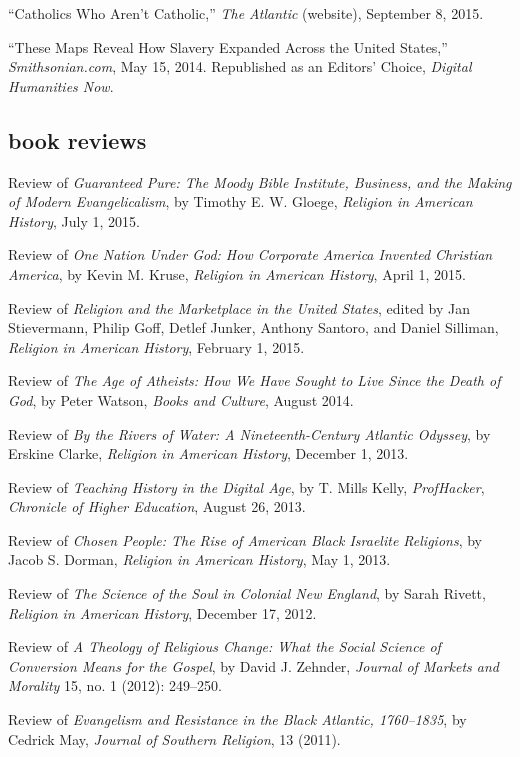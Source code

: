 \documentclass[11pt]{article}
\begin{document}
``Catholics Who Aren't Catholic,'' \emph{The Atlantic} (website), September 8, 
2015.

``These Maps Reveal How Slavery Expanded Across the United States,''
\emph{Smithsonian.com}, May 15, 2014. Republished as an Editors' Choice,
\emph{Digital Humanities Now}.

\subsection{book reviews}\label{book-reviews}

Review of \emph{Guaranteed Pure: The Moody Bible Institute, Business, and the 
  Making of Modern Evangelicalism}, by Timothy E. W. Gloege, \emph{Religion in 
  American History}, July 1, 2015.

Review of \emph{One Nation Under God: How Corporate America Invented Christian 
  America}, by Kevin M. Kruse, \emph{Religion in American History}, April 1, 
2015.

Review of \emph{Religion and the Marketplace in the United States},
edited by Jan Stievermann, Philip Goff, Detlef Junker, Anthony Santoro,
and Daniel Silliman, \emph{Religion in American History}, February 1,
2015.

Review of \emph{The Age of Atheists: How We Have Sought to Live Since
  the Death of God}, by Peter Watson, \emph{Books and Culture}, August
2014.

Review of \emph{By the Rivers of Water: A Nineteenth-Century Atlantic
  Odyssey}, by Erskine Clarke, \emph{Religion in American History},
December 1, 2013.

Review of \emph{Teaching History in the Digital Age}, by T. Mills Kelly,
\emph{ProfHacker}, \emph{Chronicle of Higher Education}, August 26,
2013.

Review of \emph{Chosen People: The Rise of American Black Israelite
  Religions}, by Jacob S. Dorman, \emph{Religion in American History}, May
1, 2013.

Review of \emph{The Science of the Soul in Colonial New England}, by
Sarah Rivett, \emph{Religion in American History}, December 17, 2012.

Review of \emph{A Theology of Religious Change: What the Social Science
  of Conversion Means for the Gospel}, by David J. Zehnder, \emph{Journal
  of Markets and Morality} 15, no. 1 (2012): 249--250.

Review of \emph{Evangelism and Resistance in the Black Atlantic,
  1760--1835}, by Cedrick May, \emph{Journal of Southern Religion}, 13
(2011).
\end{document}
